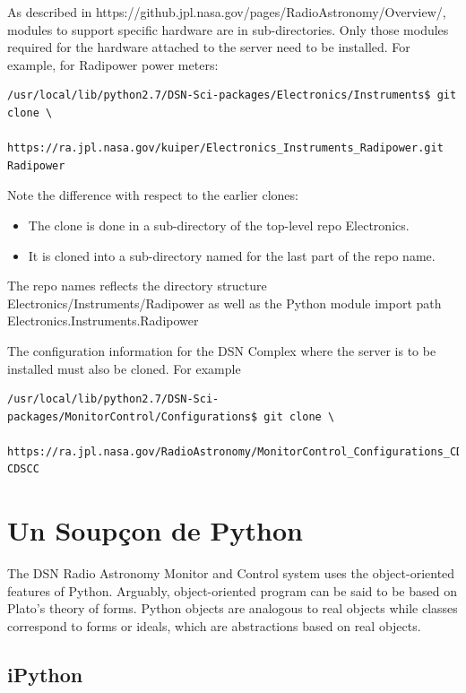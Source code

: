 \documentclass[letterpaper,11pt]{book}
\begin{document}
As described in {\ttfamily https://github.jpl.nasa.gov/pages/RadioAstronomy/Overview/},
modules to support specific hardware are in sub-directories.  Only those modules
required for the hardware attached to the server need to be installed.  For
example, for Radipower power meters:
{\small \begin{verbatim}
/usr/local/lib/python2.7/DSN-Sci-packages/Electronics/Instruments$ git clone \
        https://ra.jpl.nasa.gov/kuiper/Electronics_Instruments_Radipower.git Radipower\end{verbatim}
}\noindent Note the difference with respect to the earlier clones:
\begin{itemize}\itemsep0pt \parskip0pt \parsep0pt
\item The {\ttfamily clone} is done in a sub-directory of the top-level repo
{\ttfamily Electronics}.
\item It is cloned into a sub-directory named for the last part of the repo name.
\end{itemize}
\noindent The repo names reflects the directory structure 
{\ttfamily Electronics/Instruments/Radipower} as well as the Python module 
import path {\ttfamily Electronics.Instruments.Radipower}

The configuration information for the DSN Complex where the server is
to be installed must also be cloned. For example
{\small \begin{verbatim}
/usr/local/lib/python2.7/DSN-Sci-packages/MonitorControl/Configurations$ git clone \
  https://ra.jpl.nasa.gov/RadioAstronomy/MonitorControl_Configurations_CDSCC.git CDSCC
\end{verbatim}
}\noindent


\chapter{Un Soup\c{c}on de Python}\label{Python}

The DSN Radio Astronomy Monitor and Control system uses the object-oriented
features of Python.  Arguably, object-oriented program can be said to be based
on Plato's theory of forms.  Python objects are analogous to real objects
while classes correspond to forms or ideals, which are abstractions based on
real objects.

\section{\ttfamily iPython}
\end{document}
